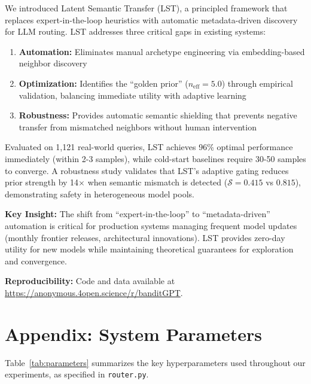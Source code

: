 \documentclass[sigconf,nonacm]{acmart}
\begin{document}
We introduced Latent Semantic Transfer (LST), a principled framework that replaces expert-in-the-loop heuristics with automatic metadata-driven discovery for LLM routing. LST addresses three critical gaps in existing systems:

\begin{enumerate}
    \item \textbf{Automation:} Eliminates manual archetype engineering via embedding-based neighbor discovery
    \item \textbf{Optimization:} Identifies the ``golden prior'' ($n_{\text{eff}} = 5.0$) through empirical validation, balancing immediate utility with adaptive learning
    \item \textbf{Robustness:} Provides automatic semantic shielding that prevents negative transfer from mismatched neighbors without human intervention
\end{enumerate}

Evaluated on 1,121 real-world queries, LST achieves 96\% optimal performance immediately (within 2-3 samples), while cold-start baselines require 30-50 samples to converge. A robustness study validates that LST's adaptive gating reduces prior strength by 14$\times$ when semantic mismatch is detected ($\mathcal{S} = 0.415$ vs $0.815$), demonstrating safety in heterogeneous model pools.

\textbf{Key Insight:} The shift from ``expert-in-the-loop'' to ``metadata-driven'' automation is critical for production systems managing frequent model updates (monthly frontier releases, architectural innovations). LST provides zero-day utility for new models while maintaining theoretical guarantees for exploration and convergence.

\textbf{Reproducibility:} Code and data available at \url{https://anonymous.4open.science/r/banditGPT}.

\section*{Appendix: System Parameters}

Table~\ref{tab:parameters} summarizes the key hyperparameters used throughout our experiments, as specified in \texttt{router.py}.
\end{document}
